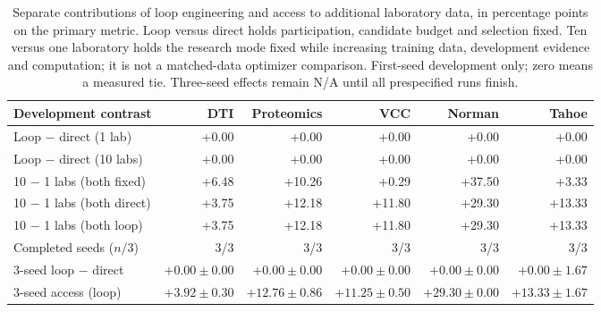 \begin{table}[t]
\centering\footnotesize
\setlength{\tabcolsep}{2.5pt}
\begin{tabular}{lrrrrr}
\toprule
Development contrast & DTI & Proteomics & VCC & Norman & Tahoe \\
\midrule
Loop $-$ direct (1 lab) & +0.00 & +0.00 & +0.00 & +0.00 & +0.00 \\
Loop $-$ direct (10 labs) & +0.00 & +0.00 & +0.00 & +0.00 & +0.00 \\
10 $-$ 1 labs (both fixed) & +6.48 & +10.26 & +0.29 & +37.50 & +3.33 \\
10 $-$ 1 labs (both direct) & +3.75 & +12.18 & +11.80 & +29.30 & +13.33 \\
10 $-$ 1 labs (both loop) & +3.75 & +12.18 & +11.80 & +29.30 & +13.33 \\
\midrule
Completed seeds ($n/3$) & 3/3 & 3/3 & 3/3 & 3/3 & 3/3 \\
3-seed loop $-$ direct & $+0.00\pm0.00$ & $+0.00\pm0.00$ & $+0.00\pm0.00$ & $+0.00\pm0.00$ & $+0.00\pm1.67$ \\
3-seed access (loop) & $+3.92\pm0.30$ & $+12.76\pm0.86$ & $+11.25\pm0.50$ & $+29.30\pm0.00$ & $+13.33\pm1.67$ \\
\bottomrule
\end{tabular}
\caption{Separate contributions of loop engineering and access to additional laboratory data, in percentage points on the primary metric. Loop versus direct holds participation, candidate budget and selection fixed. Ten versus one laboratory holds the research mode fixed while increasing training data, development evidence and computation; it is not a matched-data optimizer comparison. First-seed development only; zero means a measured tie. Three-seed effects remain N/A until all prespecified runs finish.}
\label{tab:unified-effects}
\end{table}
